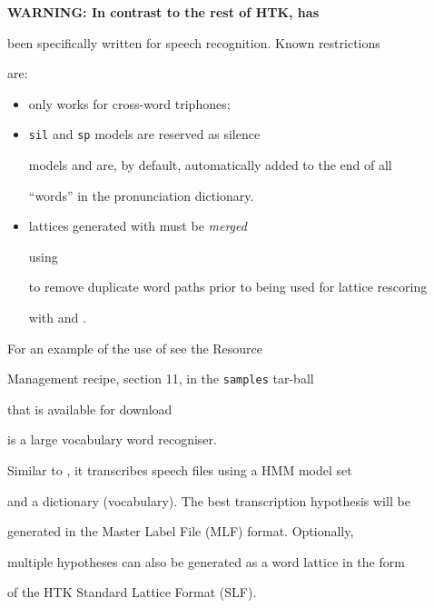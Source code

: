 {\bf\large WARNING: In contrast to the rest of HTK,  has


been specifically written for speech recognition. Known restrictions


are:


\begin{itemize}


\item only works for cross-word triphones;


\item \texttt{sil} and \texttt{sp} models are reserved as silence


models and are, by default, automatically added to the end of all


``words'' in the pronunciation dictionary.


\item lattices generated with  must be {\em merged} 


using 


to remove duplicate word paths prior to being used for lattice rescoring


with  and .


\end{itemize}


For an example of the use of  see the Resource


Management recipe, section 11, in the \texttt{samples} tar-ball


that is available for download


}












 is a large vocabulary word recogniser.  


Similar to , it transcribes speech files using a HMM model set


and a dictionary (vocabulary). The best transcription hypothesis will be


generated in the Master Label File (MLF) format. Optionally,


multiple hypotheses can also be generated as a word lattice in the form


of the HTK Standard Lattice Format (SLF).





